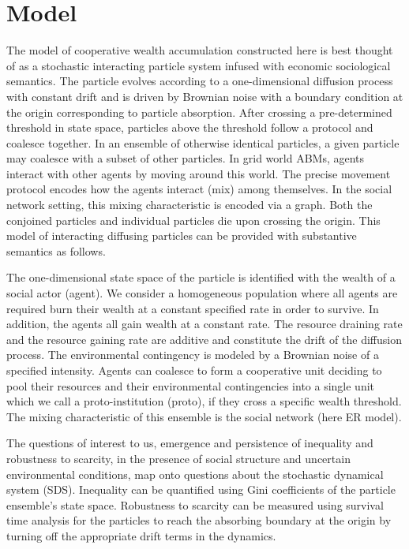 \section{Model}
The model of cooperative wealth accumulation constructed here is best thought of as a stochastic interacting particle system infused with economic sociological semantics. The particle evolves according to a one-dimensional diffusion process with constant drift and is driven by Brownian noise with a boundary condition at the origin corresponding to particle absorption. After crossing a pre-determined threshold in state space, particles above the threshold follow a protocol and coalesce together. In an ensemble of otherwise identical particles, a given particle may coalesce with a subset of other particles. In grid world ABMs, agents interact with other agents by moving around this world. The precise movement protocol encodes how the agents interact (mix) among themselves. In the social network setting, this mixing characteristic is encoded via a graph. Both the conjoined particles and individual particles die upon crossing the origin. This model of interacting diffusing particles can be provided with substantive semantics as follows. 

The one-dimensional state space of the particle is identified with the wealth of a social actor (agent). We consider a homogeneous population where all agents are required burn their wealth at a constant specified rate in order to survive. In addition, the agents all gain wealth at a constant rate. The resource draining rate and the resource gaining rate are additive and constitute the drift of the diffusion process. The environmental contingency is modeled by a Brownian noise of a specified intensity. Agents can coalesce to form a cooperative unit deciding to pool their resources and their environmental contingencies into a single unit which we call a proto-institution (proto), if they cross a specific wealth threshold. The mixing characteristic of this ensemble is the social network (here ER model).          

The questions of interest to us, emergence and persistence of inequality and robustness to scarcity, in the presence of social structure and uncertain environmental conditions, map onto questions about the stochastic dynamical system (SDS). Inequality can be quantified using Gini coefficients of the particle ensemble's state space. Robustness to scarcity can be measured using survival time analysis for the particles to reach the absorbing boundary at the origin by turning off the appropriate drift terms in the dynamics. 

